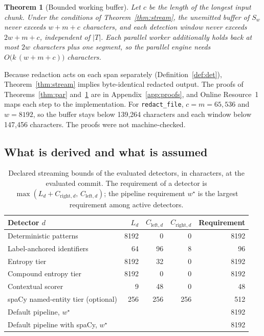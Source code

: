 \documentclass[pdflatex,sn-mathphys-num]{sn-jnl}
\theoremstyle{thmstyleone}
\newtheorem{theorem}{Theorem}
\theoremstyle{thmstylethree}
\begin{document}
\begin{theorem}[Bounded working buffer]\label{thm:mem}
Let $c$ be the length of the longest input chunk. Under the conditions of Theorem~\ref{thm:stream}, the unemitted buffer of $S_w$ never exceeds $w + m + c$ characters, and each detection window never exceeds $2w + m + c$, independent of $|T|$. Each parallel worker additionally holds back at most $2w$ characters plus one segment, so the parallel engine needs $O\bigl(k\,(w + m + c)\bigr)$ characters.
\end{theorem}

Because redaction acts on each span separately (Definition~\ref{def:det}), Theorem~\ref{thm:stream} implies byte-identical redacted output. The proofs of Theorems~\ref{thm:par} and~\ref{thm:mem} are in Appendix~\ref{app:proofs}, and Online Resource~1 maps each step to the implementation. For \texttt{redact\_file}, $c = m = 65{,}536$ and $w = 8192$, so the buffer stays below 139,264 characters and each window below 147,456 characters. The proofs were not machine-checked.

\subsection{What is derived and what is assumed}\label{sec:derived}

\begin{table}[t]
\caption{Declared streaming bounds of the evaluated detectors, in characters, at the evaluated commit. The requirement of a detector is $\max(L_d + C_{\mathrm{right},d},\, C_{\mathrm{left},d})$; the pipeline requirement $w^{\star}$ is the largest requirement among active detectors.}\label{tab:bounds}
\footnotesize
\begin{tabular*}{\textwidth}{@{\extracolsep\fill}lrrrr}
\toprule
Detector $d$ & $L_d$ & $C_{\mathrm{left},d}$ & $C_{\mathrm{right},d}$ & Requirement \\
\midrule
Deterministic patterns & 8192 & 0 & 0 & 8192 \\
Label-anchored identifiers & 64 & 96 & 8 & 96 \\
Entropy tier & 8192 & 32 & 0 & 8192 \\
Compound entropy tier & 8192 & 0 & 0 & 8192 \\
Contextual scorer & 9 & 48 & 0 & 48 \\
spaCy named-entity tier (optional) & 256 & 256 & 256 & 512 \\
\midrule
Default pipeline, $w^{\star}$ & & & & 8192 \\
Default pipeline with spaCy, $w^{\star}$ & & & & 8192 \\
\bottomrule
\end{tabular*}
\end{table}
\end{document}
